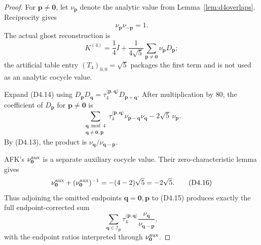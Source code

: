 \documentclass[11pt]{article}
\begin{document}
\begin{proof}
For $\boldsymbol p\ne\boldsymbol0$, let
$\nu_{\boldsymbol p}$ denote the analytic value from
Lemma~\ref{lem:d4overlaps}.  Reciprocity gives
\[
 \nu_{\boldsymbol p}\nu_{-\boldsymbol p}=1.
\tag{D4.13}
\]
The actual ghost reconstruction is
\[
 K^{(4)}=\frac14I+\frac1{4\sqrt5}
 \sum_{\boldsymbol p\ne\boldsymbol0}
 \nu_{\boldsymbol p}D_{\boldsymbol p};
\tag{D4.14}
\]
the artificial table entry $(T_4)_{0,0}=\sqrt5$ packages the first
term and is not used as an analytic cocycle value.

Expand \textup{(D4.14)} using
$D_{\boldsymbol p}D_{\boldsymbol q}
=\tau_4^{\langle\boldsymbol p,\boldsymbol q\rangle}
D_{\boldsymbol p+\boldsymbol q}$.  After multiplication by $80$, the
coefficient of $D_{\boldsymbol p}$ for
$\boldsymbol p\ne\boldsymbol0$ is
\[
 \sum_{\substack{\boldsymbol q\bmod4\\
       \boldsymbol q\ne\boldsymbol0,\boldsymbol p}}
 \tau_4^{\langle\boldsymbol p,\boldsymbol q\rangle}
 \nu_{\boldsymbol p-\boldsymbol q}\nu_{\boldsymbol q}
 -2\sqrt5\,\nu_{\boldsymbol p}.
\tag{D4.15}
\]
By \textup{(D4.13)}, the product is
$\nu_{\boldsymbol q}/\nu_{\boldsymbol q-\boldsymbol p}$.

AFK's $\nu_{\boldsymbol0}^{\rm aux}$ is a separate auxiliary cocycle
value.  Their zero-characteristic lemma gives
\[
 \nu_{\boldsymbol0}^{\rm aux}
 +(\nu_{\boldsymbol0}^{\rm aux})^{-1}
 =-(4-2)\sqrt5=-2\sqrt5.
\tag{D4.16}
\]
Thus adjoining the omitted endpoints
$\boldsymbol q=\boldsymbol0,\boldsymbol p$ to \textup{(D4.15)}
produces exactly the full endpoint-corrected sum
\[
 \sum_{\boldsymbol q\in\mathcal I_{\boldsymbol p}}
 \tau_4^{\langle\boldsymbol p,\boldsymbol q\rangle}
 \frac{\nu_{\boldsymbol q}}
 {\nu_{\boldsymbol q-\boldsymbol p}},
\tag{D4.17}
\]
with the endpoint ratios interpreted through
$\nu_{\boldsymbol0}^{\rm aux}$.


\end{proof}
\end{document}
